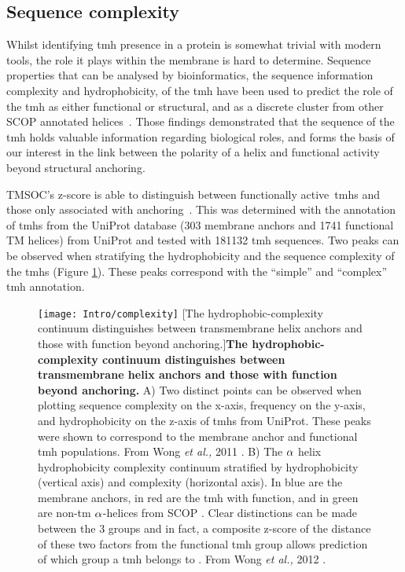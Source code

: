 \subsection{Sequence complexity}
Whilst identifying \gls{tmh} presence in a protein is somewhat trivial with modern tools, the role it plays within the membrane is hard to determine. Sequence properties that can be analysed by bioinformatics, the sequence information complexity and hydrophobicity, of the \gls{tmh} have been used to predict the role of the \gls{tmh} as either functional or structural, and as a discrete cluster from other SCOP annotated helices~\cite{Wong2012}.
Those findings demonstrated that the sequence of the \gls{tmh} holds valuable information regarding biological roles, and forms the basis of our interest in the link between the polarity of a helix and functional activity beyond structural anchoring.

TMSOC's z-score is able to distinguish between functionally active~\gls{tmh}s and those only associated with anchoring~\cite{Wong2011, Wong2012}.
This was determined with the annotation of \gls{tmh}s from the UniProt database (303 membrane anchors and 1741 functional TM helices) from UniProt \cite{TheUniProtConsortium2014} and tested with 181132 \gls{tmh} sequences.
Two peaks can be observed when stratifying the hydrophobicity and the sequence complexity of the \gls{tmh}s (Figure \ref{fig:complexity}).
These peaks correspond with the ``simple'' and ``complex'' \gls{tmh} annotation.

\begin{figure}[ht]
\centering
\texttt{[image: Intro/complexity]}
		[The hydrophobic\--complexity continuum distinguishes between transmembrane helix anchors and those with function beyond anchoring.]{\textbf{The hydrophobic\--complexity continuum distinguishes between transmembrane helix anchors and those with function beyond anchoring.}
		A) Two distinct points can be observed when plotting sequence complexity on the x\--axis, frequency on the y\--axis, and hydrophobicity on the z\--axis of \gls{tmh}s from UniProt.
		These peaks were shown to correspond to the membrane anchor and functional \gls{tmh} populations.
		From Wong \textit{et al.,} 2011 \cite{Wong2011}.
		B) The $\protect\alpha$ helix hydrophobicity complexity continuum stratified by hydrophobicity (vertical axis) and complexity (horizontal axis).
		In blue are the membrane anchors, in red are the \gls{tmh} with function, and in green are non\--\gls{tm} $\protect\alpha$\--helices from SCOP \cite{Murzin1995}.
		Clear distinctions can be made between the 3 groups and in fact, a composite z-score of the distance of these two factors from the functional \gls{tmh} group allows prediction of which group a \gls{tmh} belongs to \cite{Wong2011, Wong2012}.
		From Wong \textit{et al.,} 2012 \cite{Wong2012}.
		}
\label{fig:complexity}
\end{figure}

